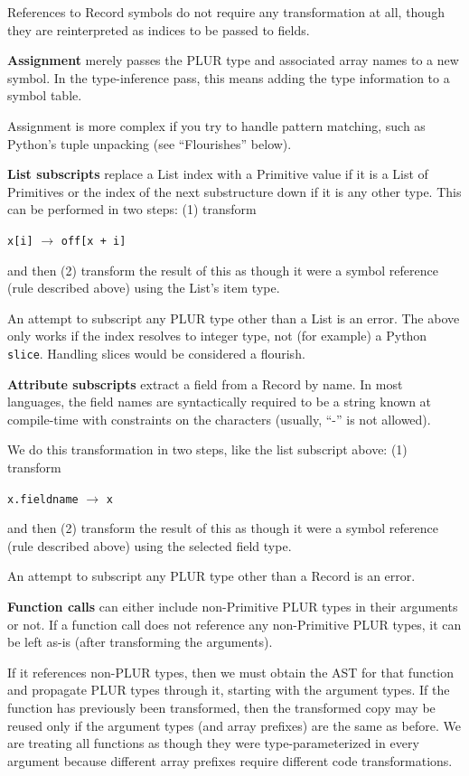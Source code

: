 \documentclass[10pt, conference, compsocconf]{IEEEtran}
\begin{document}
References to Record symbols do not require any transformation at all, though they are reinterpreted as indices to be passed to fields.

{\bf Assignment} merely passes the PLUR type and associated array names to a new symbol. In the type-inference pass, this means adding the type information to a symbol table.

Assignment is more complex if you try to handle pattern matching, such as Python's tuple unpacking (see ``Flourishes'' below).

{\bf List subscripts} replace a List index with a Primitive value if it is a List of Primitives or the index of the next substructure down if it is any other type. This can be performed in two steps: (1) transform
\begin{center}
{\tt x[i]} $\to$ {\tt off[x + i]}
\end{center}
and then (2) transform the result of this as though it were a symbol reference (rule described above) using the List's item type.

An attempt to subscript any PLUR type other than a List is an error. The above only works if the index resolves to integer type, not (for example) a Python {\tt slice}. Handling slices would be considered a flourish.

{\bf Attribute subscripts} extract a field from a Record by name. In most languages, the field names are syntactically required to be a string known at compile-time with constraints on the characters (usually, ``-'' is not allowed).

We do this transformation in two steps, like the list subscript above: (1) transform
\begin{center}
{\tt x.fieldname} $\to$ {\tt x}
\end{center}
and then (2) transform the result of this as though it were a symbol reference (rule described above) using the selected field type.

An attempt to subscript any PLUR type other than a Record is an error.

{\bf Function calls} can either include non-Primitive PLUR types in their arguments or not. If a function call does not reference any non-Primitive PLUR types, it can be left as-is (after transforming the arguments).

If it references non-PLUR types, then we must obtain the AST for that function and propagate PLUR types through it, starting with the argument types. If the function has previously been transformed, then the transformed copy may be reused only if the argument types (and array prefixes) are the same as before. We are treating all functions as though they were type-parameterized in every argument because different array prefixes require different code transformations.
\end{document}
